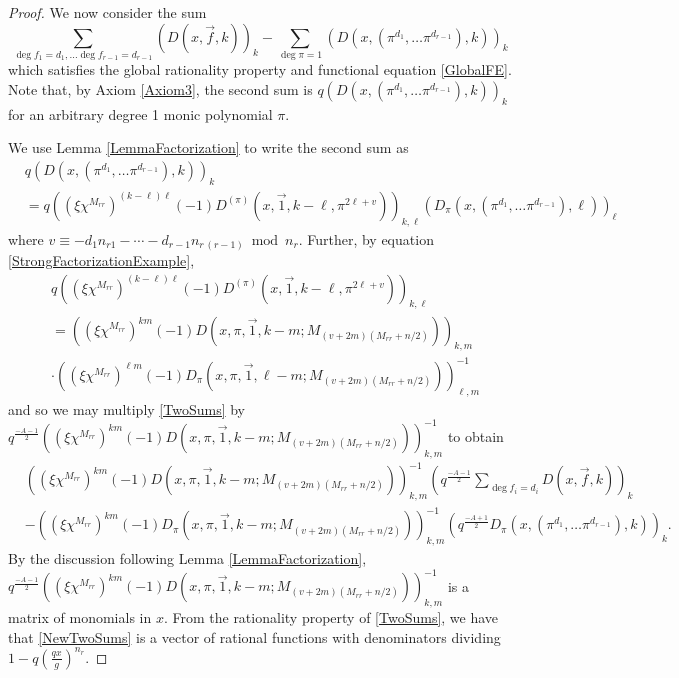 \documentclass[11pt,letterpaper]{article}
\theoremstyle{definition}
\theoremstyle{remark}
\numberwithin{equation}{section}
\theoremstyle{dotless}
\begin{document}
\begin{proof}
We now consider the sum
\begin{equation}\label{TwoSums}
\sum_{\deg f_1 = d_1, \ldots \deg f_{r-1}=d_{r-1}} \left(D(x, \vec{f}, k)\right)_k - \sum_{\deg \pi =1} \left(D(x, (\pi^{d_1}, \ldots \pi^{d_{r-1}}), k)\right)_k
\end{equation}
which satisfies the global rationality property and functional equation \eqref{GlobalFE}. Note that, by Axiom \ref{Axiom3}, the second sum is $q\left(D(x, (\pi^{d_1}, \ldots \pi^{d_{r-1}}), k)\right)_k$ for an arbitrary degree 1 monic polynomial $\pi$. 

We use Lemma \ref{LemmaFactorization} to write the second sum as 
\begin{equation*}
\begin{split}
& q\left(D(x, (\pi^{d_1}, \ldots \pi^{d_{r-1}}), k)\right)_k \\
&= q\left((\xi \chi^{M_{rr}})^{(k-\ell)\ell} (-1)  D^{(\pi)}(x, \vec{1}, k-\ell, \pi^{2\ell + v}) \right)_{k, \ell} \left(D_\pi(x, (\pi^{d_1}, \ldots \pi^{d_{r-1}}), \ell) \right)_\ell
\end{split}
\end{equation*}
where $v\equiv -d_1 n_{r1} - \cdots - d_{r-1} n_{r \, (r-1)} \bmod n_r$. Further, by equation \eqref{StrongFactorizationExample}, 
\begin{equation*}
\begin{split}
&q\left((\xi \chi^{M_{rr}})^{(k-\ell)\ell} (-1)  D^{(\pi)}(x, \vec{1}, k-\ell, \pi^{2\ell + v}) \right)_{k, \ell} \\
&= \left( (\xi \chi^{M_{rr}})^{k m}(-1)D(x, \pi, \vec{1}, k-m; M_{(v+2m)(M_{rr}+n/2)}) \right)_{k,m} \\
&\cdot \left((\xi \chi^{M_{rr}})^{\ell m}(-1) D_\pi(x, \pi, \vec{1}, \ell-m; M_{(v+2m)(M_{rr}+n/2)}) \right)_{\ell,m}^{-1}
\end{split}
\end{equation*}
and so we may multiply \eqref{TwoSums} by $q^{\frac{-A-1}{2}}\left( (\xi \chi^{M_{rr}})^{k m}(-1)D(x, \pi, \vec{1}, k-m; M_{(v+2m)(M_{rr}+n/2)}) \right)_{k,m}^{-1}$ to obtain 
\begin{equation}\label{NewTwoSums}
\begin{split}
&\left( (\xi \chi^{M_{rr}})^{k m}(-1)D(x, \pi, \vec{1}, k-m; M_{(v+2m)(M_{rr}+n/2)}) \right)_{k,m}^{-1} \left( q^{\frac{-A-1}{2}} \sum_{\deg f_i = d_i} D(x, \vec{f}, k)\right)_k \\
&- \left((\xi \chi^{M_{rr}})^{k m}(-1) D_\pi(x, \pi, \vec{1}, k-m; M_{(v+2m)(M_{rr}+n/2)}) \right)_{k,m}^{-1} \left(q^{\frac{-A+1}{2}} D_\pi(x, (\pi^{d_1}, \ldots \pi^{d_{r-1}}), k)\right)_k.
\end{split}
\end{equation}
By the discussion following Lemma \ref{LemmaFactorization}, $q^{\frac{-A-1}{2}}\left( (\xi \chi^{M_{rr}})^{k m}(-1)D(x, \pi, \vec{1}, k-m; M_{(v+2m)(M_{rr}+n/2)}) \right)_{k,m}^{-1}$ is a matrix of monomials in $x$. From the rationality property of \eqref{TwoSums}, we have that \eqref{NewTwoSums} is a vector of rational functions with denominators dividing $1-q\left(\frac{q x}{g}\right)^{n_r}$.


\end{proof}
\end{document}
